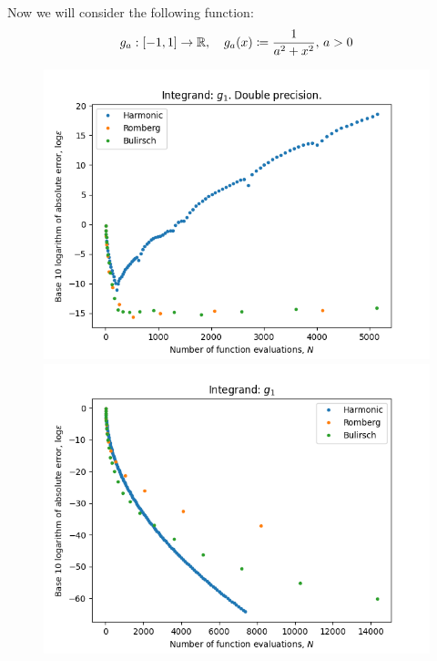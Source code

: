 Now we will consider the following function:
\[
g_a: [-1, 1] \rightarrow \mathbb{R}, \quad g_a(x) \coloneqq \frac{1}{a^2 + x^2},\, a > 0
\]

\begin{figure}[H]
\centering
\begin{minipage}{0.45\textwidth}
\centering
\includegraphics[scale=0.45]{../results/romberg_plots/g_one.png}
\end{minipage}
\begin{minipage}{0.45\textwidth}
\centering
\includegraphics[scale=0.45]{../results/romberg_plots/g_one_hp.png}
\end{minipage}
\end{figure}

